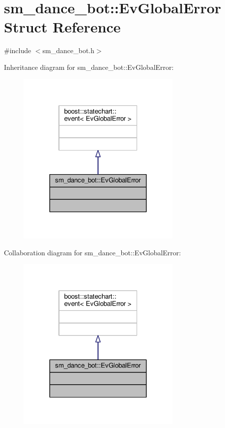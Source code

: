 \hypertarget{structsm__dance__bot_1_1EvGlobalError}{}\section{sm\+\_\+dance\+\_\+bot\+:\+:Ev\+Global\+Error Struct Reference}
\label{structsm__dance__bot_1_1EvGlobalError}


{\ttfamily \#include $<$sm\+\_\+dance\+\_\+bot.\+h$>$}



Inheritance diagram for sm\+\_\+dance\+\_\+bot\+:\+:Ev\+Global\+Error\+:
\nopagebreak
\begin{figure}[H]
\begin{center}
\leavevmode
\includegraphics[width=227pt]{structsm__dance__bot_1_1EvGlobalError__inherit__graph}
\end{center}
\end{figure}


Collaboration diagram for sm\+\_\+dance\+\_\+bot\+:\+:Ev\+Global\+Error\+:
\nopagebreak
\begin{figure}[H]
\begin{center}
\leavevmode
\includegraphics[width=227pt]{structsm__dance__bot_1_1EvGlobalError__coll__graph}
\end{center}
\end{figure}


